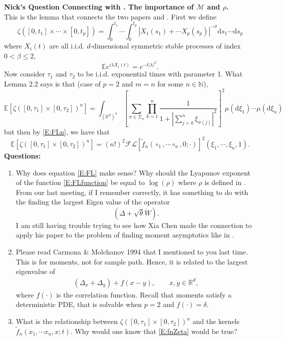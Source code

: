\documentclass[a4paper,11pt]{article}
\numberwithin{equation}{section}
\theoremstyle{plain}
\theoremstyle{definition}
\newcommand{\ud}{\ensuremath{\mathrm{d} }}
\newcommand{\R}{\mathbb{R}}
\newcounter{NQ}
\newenvironment{NickQuestion}[1][] %
{\refstepcounter{NQ}
	\begin{mdframed}[backgroundcolor=lightgray]\textbf{Nick's Question \theNQ \: #1~~}~~~\noindent}%
	{\end{mdframed}}
\numberwithin{NQ}{section}
\numberwithin{LQ}{section}
\numberwithin{ZQ}{section}
\begin{document}
\begin{NickQuestion}[Connecting \cite{BCC21} with \cite{BCR09}. The importance of $\mathcal{M}$ and $\rho$.]
This is the lemma that connects the two papers \cite{BCC21} and \cite{BCR09}. First we define 
	\[
		\zeta\left([0,t_1]\times \cdots \times [0,t_p]\right) = \int_0^{t_1}\cdots \int_0^{t_p} | X_1(s_1) + \cdots X_p(s_p)|^{-\sigma} \ud s_1 \cdots \ud s_p
	\]
where $X_i(t)$ are all i.i.d. $d$-dimensional symmetric stable processes of index $0< \beta \le 2$, 
	\[
		\mathbb{E}e^{i\lambda X_i(t)} = e^{-t|\lambda|^\beta}.
	\]
Now consider $\tau_1$ and $\tau_2$ to be i.i.d. exponential times with parameter 1. What Lemma 2.2 says is that (case of $p=2$ and $m=n$ for some $n \in \mathbb{N}$),
	\[
		\mathbb{E}\left[ \zeta\left([0,\tau_1] \times [0,\tau_2]\right)^n \right] = \int_{(\R^{d})^n} \left[ \sum_{\sigma \in \Sigma_n} \prod_{k=1}^n \frac{1}{ 1 + \left| \sum_{j=k}^n  \xi_{\sigma(j)} \right|^2 } \right]^2 \mu(\ud \xi_1) \cdots \mu(\ud \xi_n)
 	\]
 but then by \eqref{E:FLn}, we have that 
 	\begin{equation}\label{E:fnZeta}
 		\mathbb{E}\left[ \zeta\left([0,\tau_1] \times [0,\tau_2]\right)^n \right] = (n!)^2 \mathcal{F}\mathcal{L}\left[\tilde{f}_n(\circ_1,\cdots\circ_n,0;\cdot)\right]^2(\xi_1,\cdots,\xi_n,1).
 	\end{equation}
\textbf{Questions:}
\begin{enumerate}
	\item Why does equation \eqref{E:FL} make sense? Why should the Lyapunov exponent of the function \eqref{E:FLfunction} be equal to $\log(\rho)$ where $\rho$ is defined in \cite{BCR09}. From our last meeting, if I remember correctly, it has something to do with the finding the largest Eigen value of the operator
		\[
			(\Delta + \sqrt{\theta}\dot{W}).
		\]
	I am still having trouble trying to see how Xia Chen made the connection to apply his paper \cite{BCR09} to the problem of finding moment asymptotics like in \cite{BCC21}.
\item[Answer:] Please read Carmona \& Molchanov 1994 that I mentioned to you last time. This is for
	moments, not for sample path. Hence, it is related to the largest eigenvalue of
	\begin{align*}
		\left(\Delta_x + \Delta_y\right) + f(x-y), \qquad x,y\in\R^d,
	\end{align*}
	where $f(\cdot)$ is the correlation function. Recall that moments satisfy a deterministic PDE,
	that is solvable when $p=2$ and $f(\cdot)=\delta$.
	
	\item
What is the relationship between $\zeta\left([0,\tau_1] \times [0,\tau_2]\right)^n$ and the kernels $\tilde{f}_n(x_1,\cdots x_n,x;t)$. Why would one know that \eqref{E:fnZeta} would be true? 
\end{enumerate}
\end{NickQuestion}
\end{document}
